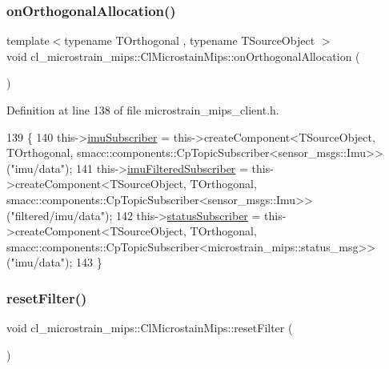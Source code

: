 \subsubsection{\texorpdfstring{on\+Orthogonal\+Allocation()}{onOrthogonalAllocation()}}
{\footnotesize\ttfamily template$<$typename T\+Orthogonal , typename T\+Source\+Object $>$ \\
void cl\+\_\+microstrain\+\_\+mips\+::\+Cl\+Microstain\+Mips\+::on\+Orthogonal\+Allocation (\begin{DoxyParamCaption}{ }\end{DoxyParamCaption})\hspace{0.3cm}{\ttfamily [inline]}}



Definition at line 138 of file microstrain\+\_\+mips\+\_\+client.\+h.


\begin{DoxyCode}
139     \{
140         this->\hyperlink{classcl__microstrain__mips_1_1ClMicrostainMips_a71648a9d970672d017c90bd3724b1104}{imuSubscriber} = this->createComponent<TSourceObject, TOrthogonal,
       smacc::components::CpTopicSubscriber<sensor\_msgs::Imu>>(\textcolor{stringliteral}{"imu/data"});
141         this->\hyperlink{classcl__microstrain__mips_1_1ClMicrostainMips_ae53fdf79a14adb9c3eff4a8966a092ff}{imuFilteredSubscriber} = this->createComponent<TSourceObject,
       TOrthogonal, smacc::components::CpTopicSubscriber<sensor\_msgs::Imu>>(\textcolor{stringliteral}{"filtered/imu/data"});
142         this->\hyperlink{classcl__microstrain__mips_1_1ClMicrostainMips_a0da593a071ac7ff8dd842b934120e315}{statusSubscriber} = this->createComponent<TSourceObject, TOrthogonal,
       smacc::components::CpTopicSubscriber<microstrain\_mips::status\_msg>>(\textcolor{stringliteral}{"imu/data"});
143     \}
\end{DoxyCode}
\mbox{\label{classcl__microstrain__mips_1_1ClMicrostainMips_ad53d21cfe5e6f8089ff00583d364d0e5}} 
\subsubsection{\texorpdfstring{reset\+Filter()}{resetFilter()}}
{\footnotesize\ttfamily void cl\+\_\+microstrain\+\_\+mips\+::\+Cl\+Microstain\+Mips\+::reset\+Filter (\begin{DoxyParamCaption}{ }\end{DoxyParamCaption})\hspace{0.3cm}{\ttfamily [inline]}}



